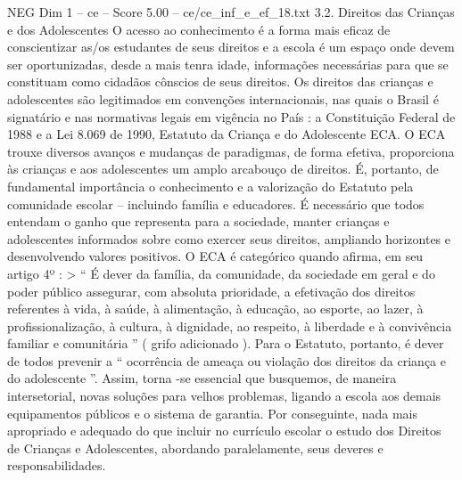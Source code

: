 \begin{textsample}{NEG Dim 1 – ce – Score 5.00 – ce/ce\_inf\_e\_ef\_18.txt}  \label{ex:f1_neg_241}
3.2.
Direitos das Crianças e dos Adolescentes O acesso ao conhecimento é a forma mais eficaz de conscientizar as/os estudantes de seus direitos e a escola é um espaço onde devem ser oportunizadas, desde a mais tenra idade, informações necessárias para que se constituam como cidadãos cônscios de seus direitos.
Os direitos das crianças e adolescentes são legitimados em convenções internacionais, nas quais o Brasil é signatário e nas normativas legais em vigência no País : a Constituição Federal de 1988 e a Lei 8.069 de 1990, Estatuto da Criança e do Adolescente ECA.
O ECA trouxe diversos avanços e mudanças de paradigmas, de forma efetiva, proporciona às crianças e aos adolescentes um amplo arcabouço de direitos.
É, portanto, de fundamental importância o conhecimento e a valorização do Estatuto pela comunidade escolar – incluindo família e educadores.
É necessário que todos entendam o ganho que representa para a sociedade, manter crianças e adolescentes informados sobre como exercer seus direitos, ampliando horizontes e desenvolvendo valores positivos.
O ECA é categórico quando afirma, em seu artigo 4º : > “ É dever da família, da comunidade, da sociedade em geral e do poder público assegurar, com absoluta prioridade, a efetivação dos direitos referentes à vida, à saúde, à alimentação, à educação, ao esporte, ao lazer, à profissionalização, à cultura, à dignidade, ao respeito, à liberdade e à convivência familiar e comunitária ” ( grifo adicionado ).
Para o Estatuto, portanto, é dever de todos prevenir a “ ocorrência de ameaça ou violação dos direitos da criança e do adolescente ”.
Assim, torna -se essencial que busquemos, de maneira intersetorial, novas soluções para velhos problemas, ligando a escola aos demais equipamentos públicos e o sistema de garantia.
Por conseguinte, nada mais apropriado e adequado do que incluir no currículo escolar o estudo dos Direitos de Crianças e Adolescentes, abordando paralelamente, seus deveres e responsabilidades.

\end{textsample}
